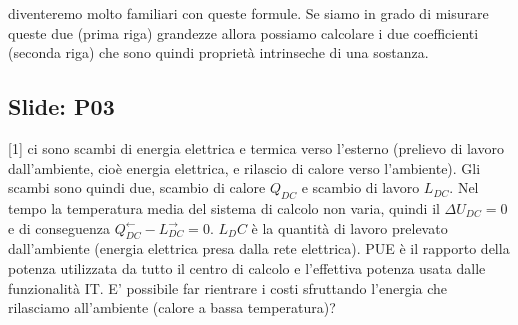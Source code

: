 \newline[14] diventeremo molto familiari con queste formule. Se siamo in grado di misurare queste due (prima riga) grandezze allora possiamo calcolare i due coefficienti (seconda riga) che sono quindi proprietà intrinseche di una sostanza.
\subsection{Slide: P03}
[1]
\newline[2] ci sono scambi di energia elettrica e termica verso l'esterno (prelievo di lavoro dall'ambiente, cioè energia elettrica,  e rilascio di calore verso l'ambiente).
\newline[3] Gli scambi sono quindi due, scambio di calore $Q_{DC}$ e scambio di lavoro $L_{DC}$. Nel tempo la temperatura media del sistema di calcolo non varia, quindi il $\Delta U_{DC} = 0$ e di conseguenza $Q_{DC}^\leftarrow - L_{DC}^\rightarrow  = 0$.
\newline[4]
\newline[5] $L_DC$ è la quantità di lavoro prelevato dall'ambiente (energia elettrica presa dalla rete elettrica).
\newline[6] 
\newline[7] PUE è il rapporto della potenza utilizzata da tutto il centro di calcolo e l'effettiva potenza usata dalle funzionalità IT.
\newline[8]
\newline[9] E' possibile far rientrare i costi sfruttando l'energia che rilasciamo all'ambiente (calore a bassa temperatura)?